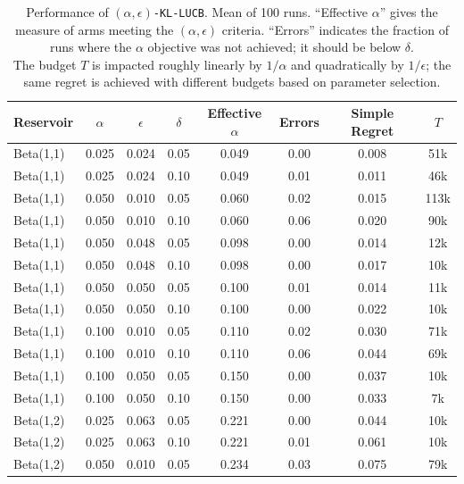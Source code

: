 \begin{table}
\caption{Performance of \texttt{$(\alpha,\epsilon)$-KL-LUCB}.
Mean of 100 runs.
``Effective $\alpha$'' gives the measure of arms meeting the $(\alpha,\epsilon)$
criteria.
``Errors'' indicates the fraction of runs where the $\alpha$
objective was not achieved; it should be below $\delta$.
\\
The budget $T$ is impacted roughly linearly by $1/\alpha$ and quadratically 
by $1/\epsilon$; the same regret is achieved with different budgets based
on parameter selection.
}
\label{tbl-results}
\vskip 0.15in
\begin{center}
\begin{small}
\begin{sc}
\begin{tabular}{lccc|cccc}
\hline
Reservoir & $\alpha$ & $\epsilon$ & $\delta$ & Effective $\alpha$ & Errors & Simple Regret & $T$ \\
\hline
Beta(1,1) & 0.025 & 0.024 & 0.05 & 0.049 & 0.00 & 0.008 & 51k \\
Beta(1,1) & 0.025 & 0.024 & 0.10 & 0.049 & 0.01 & 0.011 & 46k \\
Beta(1,1) & 0.050 & 0.010 & 0.05 & 0.060 & 0.02 & 0.015 & 113k \\
Beta(1,1) & 0.050 & 0.010 & 0.10 & 0.060 & 0.06 & 0.020 & 90k \\
Beta(1,1) & 0.050 & 0.048 & 0.05 & 0.098 & 0.00 & 0.014 & 12k \\
Beta(1,1) & 0.050 & 0.048 & 0.10 & 0.098 & 0.00 & 0.017 & 10k \\
Beta(1,1) & 0.050 & 0.050 & 0.05 & 0.100 & 0.01 & 0.014 & 11k \\
Beta(1,1) & 0.050 & 0.050 & 0.10 & 0.100 & 0.00 & 0.022 & 10k \\
Beta(1,1) & 0.100 & 0.010 & 0.05 & 0.110 & 0.02 & 0.030 & 71k \\
Beta(1,1) & 0.100 & 0.010 & 0.10 & 0.110 & 0.06 & 0.044 & 69k \\
Beta(1,1) & 0.100 & 0.050 & 0.05 & 0.150 & 0.00 & 0.037 & 10k \\
Beta(1,1) & 0.100 & 0.050 & 0.10 & 0.150 & 0.00 & 0.033 & 7k \\
Beta(1,2) & 0.025 & 0.063 & 0.05 & 0.221 & 0.00 & 0.044 & 10k \\
Beta(1,2) & 0.025 & 0.063 & 0.10 & 0.221 & 0.01 & 0.061 & 10k \\
Beta(1,2) & 0.050 & 0.010 & 0.05 & 0.234 & 0.03 & 0.075 & 79k \\

\end{tabular}
\end{sc}
\end{small}
\end{center}
\end{table}
